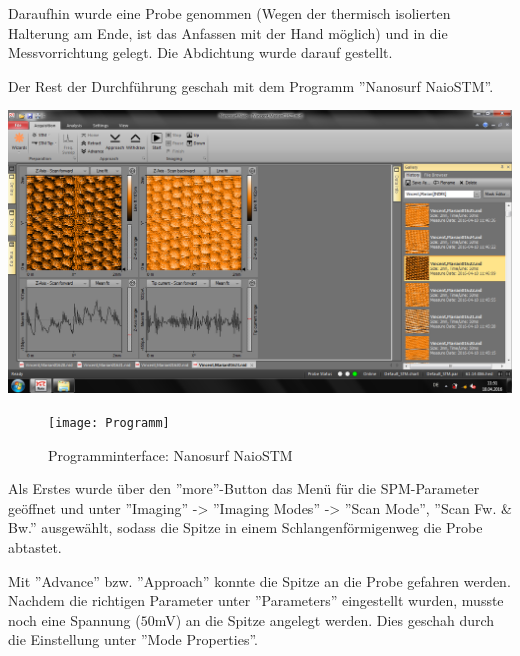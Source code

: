 \noindent Daraufhin wurde eine Probe genommen (Wegen der thermisch isolierten Halterung am Ende, ist das Anfassen mit der Hand möglich) und in die Messvorrichtung gelegt. Die Abdichtung wurde darauf gestellt.

\noindent Der Rest der Durchführung geschah mit dem Programm ''Nanosurf NaioSTM''.

\includegraphics{hopg1.png}
\begin{figure}
	\centering
		\texttt{[image: Programm]}
	\caption{Programminterface: Nanosurf NaioSTM}
	\label{fig:Programm}
\end{figure}

\noindent Als Erstes wurde über den ''more''-Button das Menü für die SPM-Parameter geöffnet und unter ''Imaging'' -> ''Imaging Modes'' -> ''Scan Mode'', ''Scan Fw. \& Bw.'' ausgewählt, sodass die Spitze in einem Schlangenförmigenweg die Probe abtastet.

\noindent Mit ''Advance'' bzw. ''Approach'' konnte die Spitze an die Probe gefahren werden. Nachdem die richtigen Parameter unter ''Parameters'' eingestellt wurden, musste noch eine Spannung (\(50\)mV) an die Spitze angelegt werden. Dies geschah durch die Einstellung unter ''Mode Properties''.
